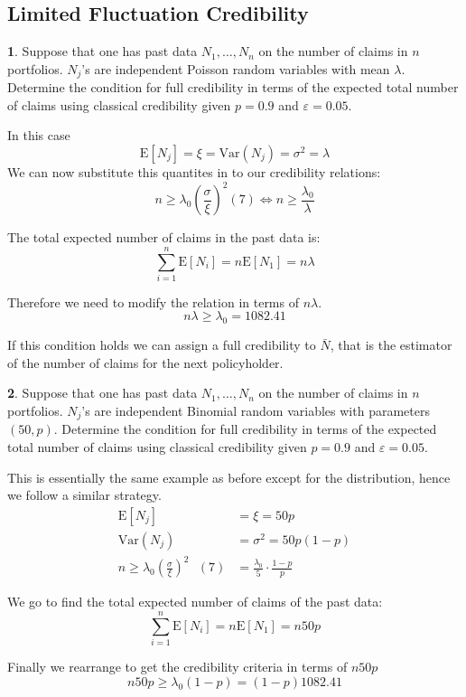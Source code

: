 \documentclass[english,12pt]{article}
\theoremstyle{plain}
\theoremstyle{definition}
\newtheorem*{example}{\protect\examplename}
\theoremstyle{definition} %
\providecommand{\examplename}{Example}
\newcommand{\ex}[1]{\mbox{E} \left[ #1 \right]}
\newcommand{\var}[1]{\mbox{Var} \left( #1 \right)}
\begin{document}
\subsection{Limited Fluctuation Credibility}
\begin{example}
Suppose that one has past data $N_1,\ldots,N_n$ on the number of claims in $n$ portfolios.  $N_j$'s are independent Poisson random variables with mean $\lambda$.  Determine the condition for full credibility in terms of the expected total number of claims using classical credibility given $p=0.9$ and $\varepsilon=0.05$.

In this case
\[\ex{N_j}=\xi=\var{N_j}=\sigma^2=\lambda\]
We can now substitute this quantites in to our credibility relations:
\[n\ge \lambda_0\left(\frac{\sigma}{\xi}\right)^2 (7)
\iff n\ge\frac{\lambda_0}{\lambda}\]

The total expected number of claims in the past data is:
\[\sum\limits_{i=1}^n\ex{N_i}=n\ex{N_1}=n\lambda\]

Therefore we need to modify the relation in terms of $n\lambda$.
\[n\lambda\ge\lambda_0=1082.41\]

If this condition holds we can assign a full credibility to $\bar{N}$, that is the estimator of the number of claims for the next policyholder.
\end{example}

\begin{example} 
Suppose that one has past data $N_1,\ldots,N_n$ on the number of claims in $n$ portfolios.  $N_j$'s are independent Binomial random variables with parameters $(50,p)$.  Determine the condition for full credibility in terms of the expected total number of claims using classical credibility given $p=0.9$ and $\varepsilon=0.05$.

This is essentially the same example as before except for the distribution, hence we follow a similar strategy.
\begin{align*}
\ex{N_j}&=\xi=50p\\
\var{N_j}&=\sigma^2=50p(1-p)\\
n\ge\lambda_0\left(\frac{\sigma}{\xi}\right)^2\text{ }(7)&=\frac{\lambda_0}{5}\cdot\frac{1-p}{p}
\end{align*}

We go to find the total expected number of claims of the past data:
\[\sum\limits_{i=1}^n\ex{N_i}=n\ex{N_1}=n50p\]

Finally we rearrange to get the credibility criteria in terms of $n50p$
\[n50p\ge\lambda_0(1-p)=(1-p)1082.41\]
\end{example}
\end{document}
